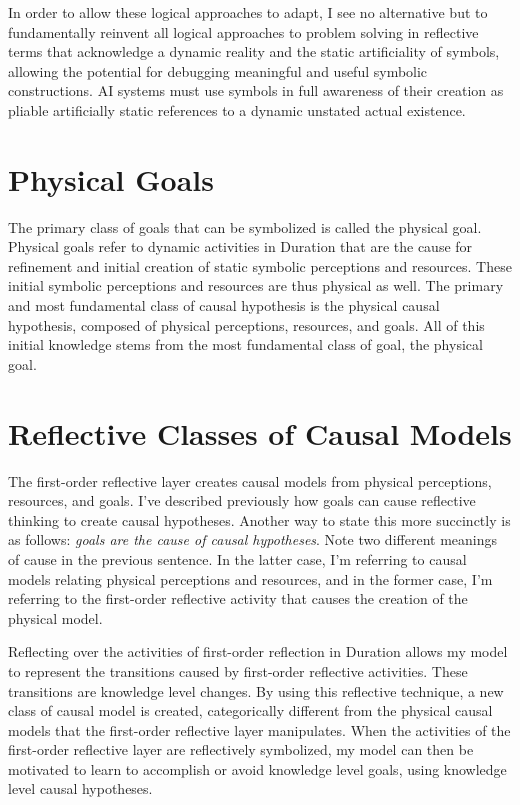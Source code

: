 In order to allow these logical approaches to adapt, I see no
alternative but to fundamentally reinvent all logical approaches to
problem solving in reflective terms that acknowledge a dynamic reality
and the static artificiality of symbols, allowing the potential for
debugging meaningful and useful symbolic constructions.  AI systems
must use symbols in full awareness of their creation as pliable
artificially static references to a dynamic unstated actual existence.

\section{Physical Goals}

The primary class of goals that can be symbolized is called the
physical goal.  Physical goals refer to dynamic activities in Duration
that are the cause for refinement and initial creation of static
symbolic perceptions and resources.  These initial symbolic
perceptions and resources are thus physical as well.  The primary and
most fundamental class of causal hypothesis is the physical causal
hypothesis, composed of physical perceptions, resources, and goals.
All of this initial knowledge stems from the most fundamental class of
goal, the physical goal.

\section{Reflective Classes of Causal Models}

The first-order reflective layer creates causal models from physical
perceptions, resources, and goals.  I've described previously how
goals can cause reflective thinking to create causal hypotheses.
Another way to state this more succinctly is as follows: \emph{goals
  are the cause of causal hypotheses}.  Note two different meanings of
cause in the previous sentence.  In the latter case, I'm referring to
causal models relating physical perceptions and resources, and in the
former case, I'm referring to the first-order reflective activity that
causes the creation of the physical model.

Reflecting over the activities of first-order reflection in Duration
allows my model to represent the transitions caused by first-order
reflective activities.  These transitions are knowledge level changes.
By using this reflective technique, a new class of causal model is
created, categorically different from the physical causal models that
the first-order reflective layer manipulates.  When the activities of
the first-order reflective layer are reflectively symbolized, my model
can then be motivated to learn to accomplish or avoid knowledge level
goals, using knowledge level causal hypotheses.

